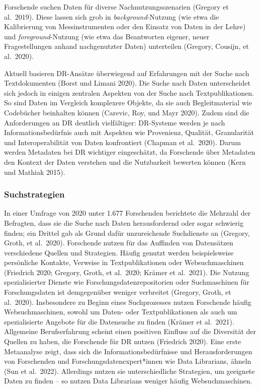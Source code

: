 \documentclass[a4paper,
fontsize=11pt,
oneside,
numbers=noperiodatend,
parskip=half-,
bibliography=totoc,
final
]{scrartcl}
\begin{document}
Forschende suchen Daten für diverse Nachnutzungsszenarien (Gregory et
al.~2019). Diese lassen sich grob in \emph{background}-Nutzung (wie etwa
die Kalibrierung von Messinstrumenten oder den Einsatz von Daten in der
Lehre) und \emph{foreground}-Nutzung (wie etwa das Beantworten eigener,
neuer Fragestellungen anhand nachgenutzter Daten) unterteilen (Gregory,
Cousijn, et al.~2020).

Aktuell basieren DR-Ansätze überwiegend auf Erfahrungen mit der Suche
nach Textdokumenten (Borst und Limani 2020). Die Suche nach Daten
unterscheidet sich jedoch in einigen zentralen Aspekten von der Suche
nach Textpublikationen. So sind Daten im Vergleich komplexere Objekte,
da sie auch Begleitmaterial wie Codebücher beinhalten können (Carevic,
Roy, und Mayr 2020). Zudem sind die Anforderungen an DR deutlich
vielfältiger: DR-Systeme werden je nach Informationsbedürfnis auch mit
Aspekten wie Provenienz, Qualität, Granularität und Interoperabilität
von Daten konfrontiert (Chapman et al.~2020). Darum werden Metadaten bei
DR wichtiger eingeschätzt, da Forschende über Metadaten den Kontext der
Daten verstehen und die Nutzbarkeit bewerten können (Kern und Mathiak
2015).

\hypertarget{suchstrategien}{%
\subsubsection{Suchstrategien}\label{suchstrategien}}

In einer Umfrage von 2020 unter 1.677 Forschenden berichtete die
Mehrzahl der Befragten, dass sie die Suche nach Daten herausfordernd
oder sogar schwierig finden; ein Drittel gab als Grund dafür
unzureichende Suchdienste an (Gregory, Groth, et al.~2020). Forschende
nutzen für das Auffinden von Datensätzen verschiedene Quellen und
Strategien. Häufig genutzt werden beispielsweise persönliche Kontakte,
Verweise in Textpublikationen oder Websuchmaschinen (Friedrich 2020;
Gregory, Groth, et al.~2020; Krämer et al.~2021). Die Nutzung
spezialisierter Dienste wie Forschungsdatenrepositorien oder
Suchmaschinen für Forschungsdaten ist demgegenüber weniger verbreitet
(Gregory, Groth, et al.~2020). Insbesondere zu Beginn eines
Suchprozesses nutzen Forschende häufig Websuchmaschinen, sowohl um
Daten- oder Textpublikationen als auch um spezialisierte Angebote für
die Datensuche zu finden (Krämer et al.~2021). Allgemeine
Berufserfahrung scheint einen positiven Einfluss auf die Diversität der
Quellen zu haben, die Forschende für DR nutzen (Friedrich 2020). Eine
erste Metaanalyse zeigt, dass sich die Informationsbedürfnisse und
Herausforderungen von Forschenden und Forschungsdatenexpert*innen wie
Data Librarians, ähneln (Sun et al.~2022). Allerdings nutzen sie
unterschiedliche Strategien, um geeignete Daten zu finden -- so nutzen
Data Librarians weniger häufig Websuchmaschinen.
\end{document}
